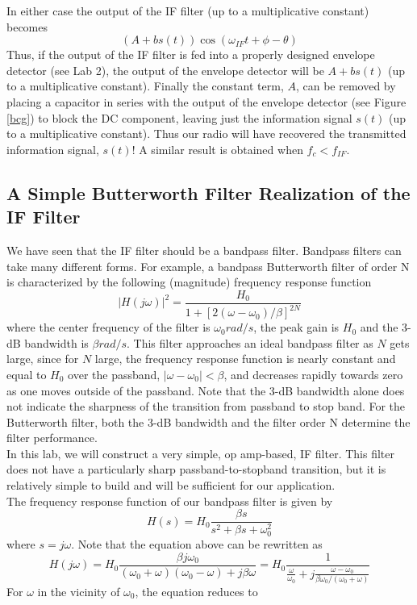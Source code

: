 \documentclass{article}
\begin{document}
In either case the output of the IF filter (up to a multiplicative constant) becomes
$$(A+bs(t))\cos(\omega_{IF}t+\phi-\theta)$$
Thus, if the output of the IF filter is fed into a properly designed envelope detector (see Lab 2), the output of the envelope detector will be $A + bs(t)$ (up to a multiplicative constant). Finally the constant term, $A$, can be removed by placing a capacitor in series with the output of the envelope detector (see Figure \ref{bcg}) to block the DC component, leaving just the information signal $s(t)$ (up to a multiplicative constant). Thus our radio will have recovered the transmitted information signal, $s(t)$! A similar result is obtained when $f_c < f_{IF}$.
\subsection{A Simple Butterworth Filter Realization of the IF Filter}
We have seen that the IF filter should be a bandpass filter. Bandpass filters can take many different forms. For example, a bandpass Butterworth filter of order N is characterized by the following (magnitude) frequency response function
$$|H(j\omega)|^2 = \frac{H_0}{1+[2(\omega-\omega_0)/\beta]^{2N}}$$
where the center frequency of the filter is $\omega_0 rad/s$, the peak gain is $H_0$ and the 3-dB bandwidth is $\beta rad/s$. This filter approaches an ideal bandpass filter as $N$ gets large, since for $N$ large, the frequency response function is nearly constant and equal to $H_0$ over the passband, $|\omega − \omega_0| < \beta$, and decreases rapidly towards zero as one moves outside of the passband. Note that the 3-dB bandwidth alone does not indicate the sharpness of the transition from passband to stop band. For the Butterworth filter, both the 3-dB bandwidth and the filter order N determine the filter performance.\\
In this lab, we will construct a very simple, op amp-based, IF filter. This filter does not have a particularly sharp passband-to-stopband transition, but it is relatively simple to build and will be sufficient for our application.\\
The frequency response function of our bandpass filter is given by
$$H(s) = H_0\frac{\beta s}{s^2+\beta s+\omega_0^2}$$
where $s = j\omega$. Note that the equation above can be rewritten as
$$H(j\omega) = H_0\frac{\beta j \omega_0}{(\omega_0+\omega)(\omega_0-\omega)+j\beta\omega} = H_0\frac{1}{\frac{\omega}{\omega_0}+j\frac{\omega-\omega_0}{\beta\omega_0/(\omega_0+\omega)}}$$
For $\omega$ in the vicinity of $\omega_0$, the equation reduces to
\end{document}

